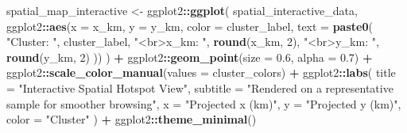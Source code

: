 \documentclass[
]{article}
\newenvironment{Shaded}{\begin{snugshade}}{\end{snugshade}}
\newcommand{\AttributeTok}[1]{\textcolor[rgb]{0.13,0.29,0.53}{#1}}
\newcommand{\DecValTok}[1]{\textcolor[rgb]{0.00,0.00,0.81}{#1}}
\newcommand{\FloatTok}[1]{\textcolor[rgb]{0.00,0.00,0.81}{#1}}
\newcommand{\FunctionTok}[1]{\textcolor[rgb]{0.13,0.29,0.53}{\textbf{#1}}}
\newcommand{\NormalTok}[1]{#1}
\newcommand{\OtherTok}[1]{\textcolor[rgb]{0.56,0.35,0.01}{#1}}
\newcommand{\SpecialCharTok}[1]{\textcolor[rgb]{0.81,0.36,0.00}{\textbf{#1}}}
\newcommand{\StringTok}[1]{\textcolor[rgb]{0.31,0.60,0.02}{#1}}
\begin{document}
\begin{Shaded}
\begin{Highlighting}[]
\NormalTok{  spatial\_map\_interactive }\OtherTok{\textless{}{-}}\NormalTok{ ggplot2}\SpecialCharTok{::}\FunctionTok{ggplot}\NormalTok{(}
\NormalTok{    spatial\_interactive\_data,}
\NormalTok{    ggplot2}\SpecialCharTok{::}\FunctionTok{aes}\NormalTok{(}\AttributeTok{x =}\NormalTok{ x\_km, }\AttributeTok{y =}\NormalTok{ y\_km, }\AttributeTok{color =}\NormalTok{ cluster\_label,}
                 \AttributeTok{text =} \FunctionTok{paste0}\NormalTok{(}
                   \StringTok{"Cluster: "}\NormalTok{, cluster\_label,}
                   \StringTok{"\textless{}br\textgreater{}x\_km: "}\NormalTok{, }\FunctionTok{round}\NormalTok{(x\_km, }\DecValTok{2}\NormalTok{),}
                   \StringTok{"\textless{}br\textgreater{}y\_km: "}\NormalTok{, }\FunctionTok{round}\NormalTok{(y\_km, }\DecValTok{2}\NormalTok{)}
\NormalTok{                 ))}
\NormalTok{  ) }\SpecialCharTok{+}
\NormalTok{    ggplot2}\SpecialCharTok{::}\FunctionTok{geom\_point}\NormalTok{(}\AttributeTok{size =} \FloatTok{0.6}\NormalTok{, }\AttributeTok{alpha =} \FloatTok{0.7}\NormalTok{) }\SpecialCharTok{+}
\NormalTok{    ggplot2}\SpecialCharTok{::}\FunctionTok{scale\_color\_manual}\NormalTok{(}\AttributeTok{values =}\NormalTok{ cluster\_colors) }\SpecialCharTok{+}
\NormalTok{    ggplot2}\SpecialCharTok{::}\FunctionTok{labs}\NormalTok{(}
      \AttributeTok{title =} \StringTok{"Interactive Spatial Hotspot View"}\NormalTok{,}
      \AttributeTok{subtitle =} \StringTok{"Rendered on a representative sample for smoother browsing"}\NormalTok{,}
      \AttributeTok{x =} \StringTok{"Projected x (km)"}\NormalTok{,}
      \AttributeTok{y =} \StringTok{"Projected y (km)"}\NormalTok{,}
      \AttributeTok{color =} \StringTok{"Cluster"}
\NormalTok{    ) }\SpecialCharTok{+}
\NormalTok{    ggplot2}\SpecialCharTok{::}\FunctionTok{theme\_minimal}\NormalTok{()}


\end{Highlighting}
\end{Shaded}
\end{document}
